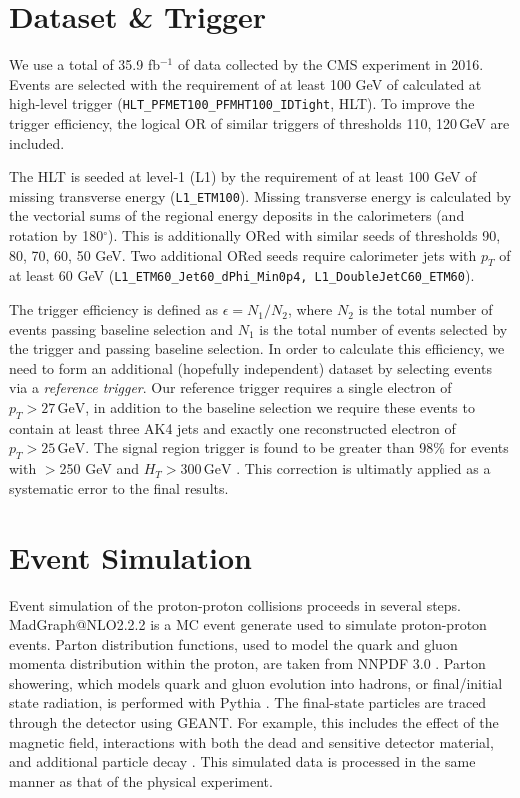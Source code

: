 \section{Dataset \& Trigger}

We use a total of 35.9 fb$^{-1}$ of data collected by the CMS experiment in 2016. Events are selected with the requirement of at least 100 GeV of \ptmiss calculated at high-level trigger (\texttt{HLT\_PFMET100\_PFMHT100\_IDTight}, HLT). To improve the trigger efficiency, the logical OR of similar triggers of thresholds 110, 120$\,$GeV are included.

The HLT is seeded at level-1 (L1) by the requirement of at least 100 GeV of missing transverse energy (\texttt{L1\_ETM100}). Missing transverse energy is calculated by the vectorial sums of the regional energy deposits in the calorimeters (and rotation by 180$^{\circ}$). This is additionally ORed with similar seeds of thresholds 90, 80, 70, 60, 50 GeV. Two additional ORed seeds require calorimeter jets with $p_{T}$ of at least 60 GeV (\texttt{L1\_ETM60\_Jet60\_dPhi\_Min0p4, L1\_DoubleJetC60\_ETM60}).

The trigger efficiency is defined as $\epsilon = N_{1}/N_{2}$, where $N_{2}$ is the total number of events passing baseline selection and $N_{1}$ is the total number of events selected by the trigger and passing baseline selection. In order to calculate this efficiency, we need to form an additional (hopefully independent) dataset by selecting events via a \textit{reference trigger}. Our reference trigger requires a single electron of $p_{T}>27\,\textrm{GeV}$, in addition to the baseline selection we require these events to contain at least three AK4 jets and exactly one reconstructed electron of $p_{T}>25\,\textrm{GeV}$. The signal region trigger is found to be greater than 98\% for events with \ptmiss$>$250 GeV and $H_{T}>300\,\textrm{GeV}$ \cite{CMS-SUS-16-033}. This correction is ultimatly applied as a systematic error to the final results.

\section{Event Simulation}

Event simulation of the proton-proton collisions proceeds in several steps. MadGraph@NLO2.2.2 \cite{Alwall:2014hca} is a MC event generate used to simulate proton-proton events. Parton distribution functions, used to model the quark and gluon momenta distribution within the proton, are taken from NNPDF 3.0 \cite{Ball:2014uwa}. Parton showering, which models quark and gluon evolution into hadrons, or final/initial state radiation, is performed with Pythia \cite{pythiacite}. The final-state particles are traced through the detector using GEANT. For example, this includes the effect of the magnetic field, interactions with both the dead and sensitive detector material, and additional particle decay \cite{Agostinelli:2002hh}. This simulated data is processed in the same manner as that of the physical experiment.

